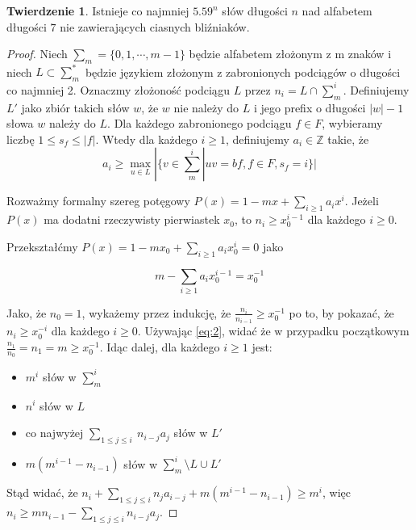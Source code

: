 \documentclass[11pt,a4paper]{article}
\theoremstyle{definition}
\newtheorem{theorem}{Twierdzenie}[section]
\begin{document}
\begin{theorem}
Istnieje co najmniej $5.59^n$ słów długości $n$ nad alfabetem długości $7$ nie zawierających ciasnych bliźniaków.
\begin{proof}
Niech $\sum\limits_m=\{0,1,\cdots ,m-1\}$ będzie alfabetem złożonym z m znaków i niech $L \subset \sum\limits^{*}_m$
będzie językiem złożonym z zabronionych podciągów o długości co najmniej 2. Oznaczmy złożoność podciągu $L$
przez $n_i = L \cap \sum\limits^{i}_m$. Definiujemy $L'$ jako zbiór takich słów $w$, że $w$ nie należy do $L$ i jego prefix o długości
$|w| - 1$ słowa $w$ należy do $L$. Dla każdego zabronionego podciągu $f \in F$, wybieramy liczbę $1 \leqslant s_f \leqslant |f|$.
Wtedy dla każdego $i \geqslant 1$, definiujemy $a_i \in \mathbb{Z}$ takie, że
\begin{equation} \label{eq:1}
	a_i \geqslant \max_{u \in L}|\{v \in \sum\limits^{i}_m | uv = bf, f \in F, s_f = i \}|
\end{equation}

Rozważmy formalny szereg potęgowy $P(x) = 1 - mx + \sum\limits_{i\geqslant 1} a_i x^i$. Jeżeli $P(x)$ ma dodatni rzeczywisty pierwiastek
$x_0$, to $n_i \geqslant x_0^{i-1}$ dla każdego $i\geqslant 0$.

Przekształćmy $P(x) = 1 - mx_0 + \sum\limits_{i\geqslant 1} a_i x_0^i = 0$ jako

\begin{equation} \label{eq:2}
m - \sum\limits_{i\geqslant 1} a_i x_0^{i-1} = x_0^{-1}
\end{equation}

Jako, że $n_0=1$, wykażemy przez indukcję, że $\frac{n_i}{n_{i-1}} \geqslant x_0^{-1}$ po to, by pokazać, że $n_i \geqslant x_0^{-i}$
dla każdego $i \geqslant 0$. Używając \autoref{eq:2}, widać że w przypadku początkowym $\frac{n_1}{n_0} = n_1 = m \geqslant x_0^{-1}$.
Idąc dalej, dla każdego $i \geqslant 1$ jest:
\begin{itemize}
\item $m^i$ słów w $\sum\limits^{i}_m$
\item $n^i$ słów w $L$
\item co najwyżej $\sum\limits_{1\leqslant j\leqslant i} ~ n_{i-j} a_j$ słów w $L'$
\item $m(m^{i-1} - n_{i-1})$ słów w $\sum\limits^{i}_m \setminus {L \cup L'}$
\end{itemize}

Stąd widać, że $n_i + \sum\limits_{1\leqslant j\leqslant i} n_j a_{i-j} + m(m^{i-1} - n_{i-1}) \geqslant m^i$, więc
$n_i \geqslant mn_{i-1} - \sum\limits_{1\leqslant j\leqslant i} n_{i-j} a_j$.


\end{proof}
\end{theorem}
\end{document}

